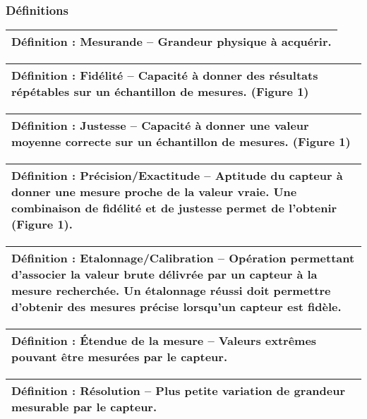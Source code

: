 \documentclass[
]{article}
\begin{document}
\hypertarget{duxe9finitions}{%
\subsubsection{Définitions}\label{duxe9finitions}}

\begin{longtable}[]{@{}l@{}}
\toprule
\endhead
\textbf{Définition : Mesurande --} Grandeur physique à acquérir. \\
\bottomrule
\end{longtable}

\begin{longtable}[]{@{}l@{}}
\toprule
\endhead
\textbf{Définition : Fidélité --} Capacité à donner des résultats
répétables sur un échantillon de mesures. (Figure 1) \\
\bottomrule
\end{longtable}

\begin{longtable}[]{@{}l@{}}
\toprule
\endhead
\textbf{Définition : Justesse --} Capacité à donner une valeur moyenne
correcte sur un échantillon de mesures. (Figure 1) \\
\bottomrule
\end{longtable}

\begin{longtable}[]{@{}l@{}}
\toprule
\endhead
\textbf{Définition : Précision/Exactitude --} Aptitude du capteur à
donner une mesure proche de la valeur vraie. Une combinaison de fidélité
et de justesse permet de l'obtenir (Figure 1). \\
\bottomrule
\end{longtable}

\begin{longtable}[]{@{}l@{}}
\toprule
\endhead
\textbf{Définition : Etalonnage/Calibration --} Opération permettant
d'associer la valeur brute délivrée par un capteur à la mesure
recherchée. Un étalonnage réussi doit permettre d'obtenir des mesures
précise lorsqu'un capteur est fidèle. \\
\bottomrule
\end{longtable}

\begin{longtable}[]{@{}l@{}}
\toprule
\endhead
\textbf{Définition : Étendue de la mesure --} Valeurs extrêmes pouvant
être mesurées par le capteur. \\
\bottomrule
\end{longtable}

\begin{longtable}[]{@{}l@{}}
\toprule
\endhead
\textbf{Définition : Résolution --} Plus petite variation de grandeur
mesurable par le capteur. \\
\bottomrule
\end{longtable}
\end{document}
